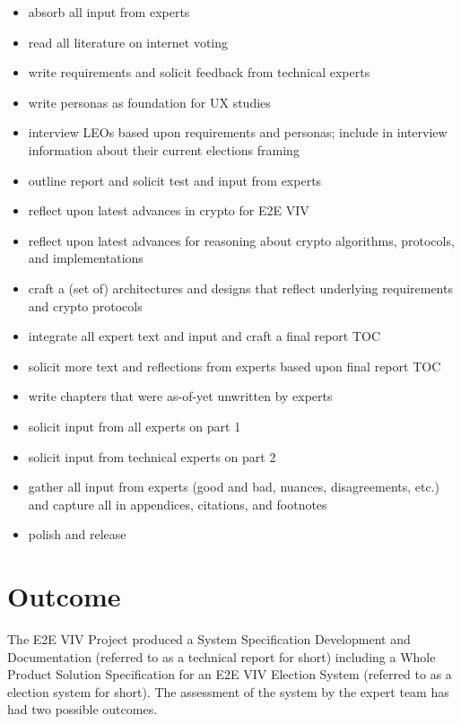 \begin{itemize}
\item absorb all input from experts
\item read all literature on internet voting
\item write requirements and solicit feedback from technical experts
\item write personas as foundation for UX studies
\item interview LEOs based upon requirements and personas; include in
  interview information about their current elections framing
\item outline report and solicit test and input from experts
\item reflect upon latest advances in crypto for E2E VIV
\item reflect upon latest advances for reasoning about crypto
  algorithms, protocols, and implementations
\item craft a (set of) architectures and designs that reflect
  underlying requirements and crypto protocols
\item integrate all expert text and input and craft a final report TOC
\item solicit more text and reflections from experts based upon final
  report TOC
\item write chapters that were as-of-yet unwritten by experts
\item solicit input from all experts on part 1
\item solicit input from technical experts on part 2
\item gather all input from experts (good and bad, nuances,
  disagreements, etc.) and capture all in appendices, citations, and
  footnotes
\item polish and release
\end{itemize}

\section{Outcome}
\label{sec:outcome}

The E2E VIV Project produced a System Specification Development and
Documentation (referred to as a technical report for short) including
a Whole Product Solution Specification for an E2E VIV Election System
(referred to as a election system for short). The assessment of the
system by the expert team has had two possible outcomes. 

